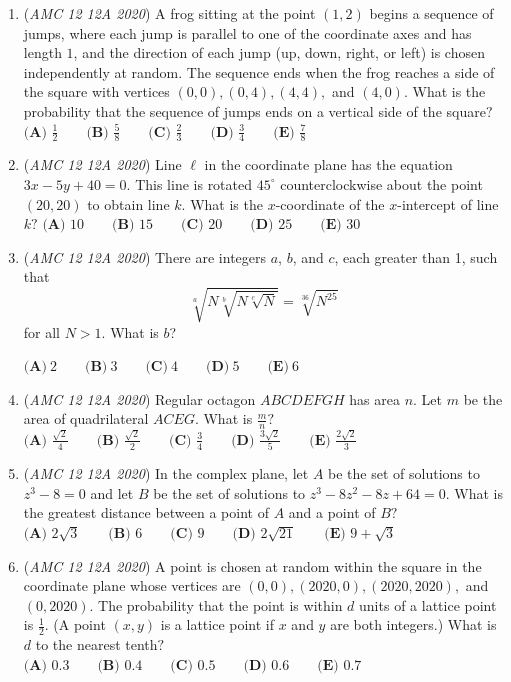 \begin{enumerate}
	\item (\textit{AMC 12 12A 2020}) A frog sitting at the point $(1, 2)$ begins a sequence of jumps, where each jump is parallel to one of the coordinate axes and has length $1$, and the direction of each jump (up, down, right, or left) is chosen independently at random. The sequence ends when the frog reaches a side of the square with vertices $(0,0), (0,4), (4,4),$ and $(4,0)$. What is the probability that the sequence of jumps ends on a vertical side of the square$?$
$\textbf{(A) } \frac{1}{2} \qquad \textbf{(B) } \frac{5}{8} \qquad \textbf{(C) } \frac{2}{3} \qquad \textbf{(D) } \frac{3}{4} \qquad \textbf{(E) } \frac{7}{8}$


	\item (\textit{AMC 12 12A 2020}) Line $\ell$ in the coordinate plane has the equation $3x - 5y + 40 = 0$. This line is rotated $45^{\circ}$ counterclockwise about the point $(20, 20)$ to obtain line $k$. What is the $x$-coordinate of the $x$-intercept of line $k?$
$\textbf{(A) } 10 \qquad \textbf{(B) } 15 \qquad \textbf{(C) } 20 \qquad \textbf{(D) } 25 \qquad \textbf{(E) } 30$


	\item (\textit{AMC 12 12A 2020}) There are integers $a$, $b$, and $c$, each greater than 1, such that
 \[\sqrt[a]{N \sqrt[b]{N \sqrt[c]{N}}} = \sqrt[36]{N^{25}}\]for all $N > 1$. What is $b$?


 $\textbf{(A)}\ 2\qquad\textbf{(B)}\ 3\qquad\textbf{(C)}\ 4\qquad\textbf{(D)}\ 5\qquad\textbf{(E)}\ 6$


	\item (\textit{AMC 12 12A 2020}) Regular octagon $ABCDEFGH$ has area $n$. Let $m$ be the area of quadrilateral $ACEG$. What is $\frac{m}{n}?$
$\textbf{(A) } \frac{\sqrt{2}}{4} \qquad \textbf{(B) } \frac{\sqrt{2}}{2} \qquad \textbf{(C) } \frac{3}{4} \qquad \textbf{(D) } \frac{3\sqrt{2}}{5} \qquad \textbf{(E) } \frac{2\sqrt{2}}{3}$


	\item (\textit{AMC 12 12A 2020}) In the complex plane, let $A$ be the set of solutions to $z^3 - 8 = 0$ and let $B$ be the set of solutions to $z^3 - 8z^2 - 8z + 64 = 0$. What is the greatest distance between a point of $A$ and a point of $B?$
$\textbf{(A) } 2\sqrt{3} \qquad \textbf{(B) } 6 \qquad \textbf{(C) } 9 \qquad \textbf{(D) } 2\sqrt{21} \qquad \textbf{(E) } 9 + \sqrt{3}$


	\item (\textit{AMC 12 12A 2020}) A point is chosen at random within the square in the coordinate plane whose vertices are $(0, 0), (2020, 0), (2020, 2020),$ and $(0, 2020)$. The probability that the point is within $d$ units of a lattice point is $\frac{1}{2}$. (A point $(x, y)$ is a lattice point if $x$ and $y$ are both integers.) What is $d$ to the nearest tenth$?$
$\textbf{(A) } 0.3 \qquad \textbf{(B) } 0.4 \qquad \textbf{(C) } 0.5 \qquad \textbf{(D) } 0.6 \qquad \textbf{(E) } 0.7$



\end{enumerate}
